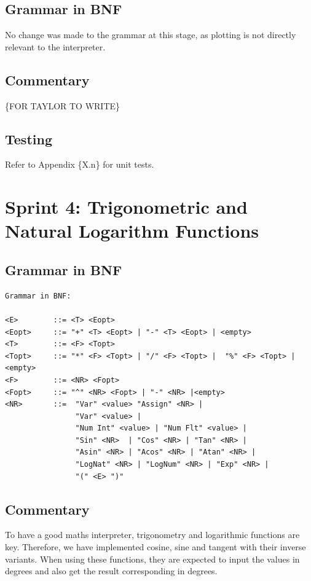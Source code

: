 \documentclass[a4paper, oneside, 11pt]{report}
\begin{document}
	\subsection{Grammar in BNF}
	No change was made to the grammar at this stage, as plotting is not directly relevant to the interpreter.

	\subsection{Commentary}
	\{FOR TAYLOR TO WRITE\}

	\subsection{Testing}
	Refer to Appendix \{X.n\} for unit tests.

	\clearpage
	\section{Sprint 4: Trigonometric and Natural Logarithm Functions}
	\subsection{Grammar in BNF}
	\begin{verbatim}
Grammar in BNF:

<E>        ::= <T> <Eopt>
<Eopt>     ::= "+" <T> <Eopt> | "-" <T> <Eopt> | <empty>
<T>        ::= <F> <Topt>
<Topt>     ::= "*" <F> <Topt> | "/" <F> <Topt> |  "%" <F> <Topt> |<empty>
<F>        ::= <NR> <Fopt>
<Fopt>     ::= "^" <NR> <Fopt> | "-" <NR> |<empty>
<NR>       ::=  "Var" <value> "Assign" <NR> |
                "Var" <value> |
                "Num Int" <value> | "Num Flt" <value> |
                "Sin" <NR>  | "Cos" <NR> | "Tan" <NR> |
                "Asin" <NR> | "Acos" <NR> | "Atan" <NR> |
                "LogNat" <NR> | "LogNum" <NR> | "Exp" <NR> |
                "(" <E> ")"
	\end{verbatim}
	\subsection{Commentary}
	To have a good maths interpreter, trigonometry and logarithmic functions are key. Therefore, we have implemented cosine, sine and tangent with their inverse variants. When using these functions, they are expected to input the values in degrees and also get the result corresponding in degrees.
\end{document}
